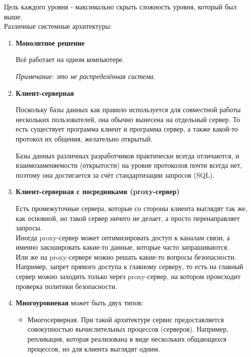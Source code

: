 \noindent Цель каждого уровня - максимально скрыть сложность уровня, который был выше.\\
{\large Различные системные архитектуры:}
\begin{enumerate}
\item \textbf{ Монолитное решение}

Всё работает на одном компьютере.

\textit{ Примечание: это не распределённая система.}

\item \textbf{ Клиент-серверная}

Поскольку базы данных как правило используется для совместной работы нескольких пользователей, она обычно вынесена на отдельный сервер. 
То есть существует программа клиент и программа сервер, а также какой-то протокол их общения, желательно открытый.

Базы данных различных разработчиков практически всегда отличаются, и взаимозаменяемости (открытости) на уровне протоколов почти всегда нет, поэтому она достигается за счёт стандартизации запросов (SQL).

\item \textbf{ Клиент-серверная с посредниками (proxy-сервер)}

Есть промежуточные сервера, которые со стороны клиента выглядят так же, как основной, но такой сервер ничего не делает, а просто перенаправляет запросы.\\
Иногда proxy-сервер может оптимизировать доступ к каналам связи, а именно закэшировать какие-то данные, которые часто запрашиваются.\\
Или же на proxy-сервере можно решать какие-то вопросы безопасности. Например, запрет прямого доступа к главному серверу, то есть на главный сервер можно заходить только через proxy-сервер, на котором происходит проверка политики безопасности.

\item \textbf{ Многоуровневая} может быть двух типов:
\begin{itemize}
\item
Многосерверная. При такой архитектуре сервис предоставляется совокупностью вычислительных процессов (серверов). Например, репликация, которая реализована в виде нескольких общающихся процессов, но для клиента выглядят одним.\\


\end{itemize}
\end{enumerate}
